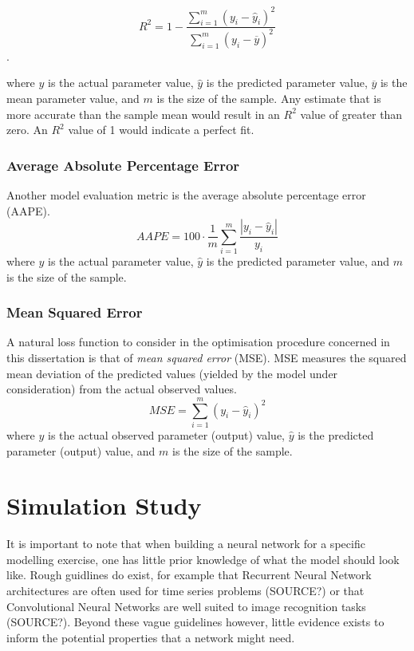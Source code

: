 \documentclass[11pt,oneside,openany,a4paper,english, report, goldenblock
]{usthesis}
\begin{document}
\begin{equation}
R^2 = 1 - \frac{\sum_{i=1}^{m}\left(y_i-\hat{y}_i\right)^2}{\sum_{i=1}^{m}\left(y_i-\overline{y}\right)^2}
\end{equation}.

where $y$ is the actual parameter value, $\hat{y}$ is the predicted parameter value, $\overline{y}$ is the mean parameter value, and $m$ is the size of the sample. Any estimate that is more accurate than the sample mean would result in an $ R^2 $ value of greater than zero. An $ R^2 $ value of 1 would indicate a perfect fit.

\subsection{Average Absolute Percentage Error}
Another model evaluation metric is the average absolute percentage error (AAPE).
\begin{equation}
AAPE = 100 \cdot \frac{1}{m} \sum_{i=1}^{m} \frac{\left| y_i - \hat{y}_i \right|}{y_i}
\end{equation}
where $y$ is the actual parameter value, $\hat{y}$ is the predicted parameter value, and $m$ is the size of the sample.

\subsection{Mean Squared Error}
A natural loss function to consider in the optimisation procedure concerned in this dissertation is that of \textit{mean squared error} (MSE). MSE measures the squared mean deviation of the predicted values (yielded by the model under consideration) from the actual observed values.
\begin{equation}
MSE = \sum_{i=1}^{m}\left(y_i-\hat{y}_i\right)^2
\end{equation}
where $y$ is the actual observed parameter (output) value, $\hat{y}$ is the predicted parameter (output) value, and $m$ is the size of the sample.

\chapter{Simulation Study}

It is important to note that when building a neural network for a specific modelling exercise, one has little prior knowledge of what the model should look like. Rough guidlines do exist, for example that Recurrent Neural Network architectures are often used for time series problems (SOURCE?) or that Convolutional Neural Networks are well suited to image recognition tasks (SOURCE?). Beyond these vague guidelines however, little evidence exists to inform the potential properties that a network might need.
\end{document}
